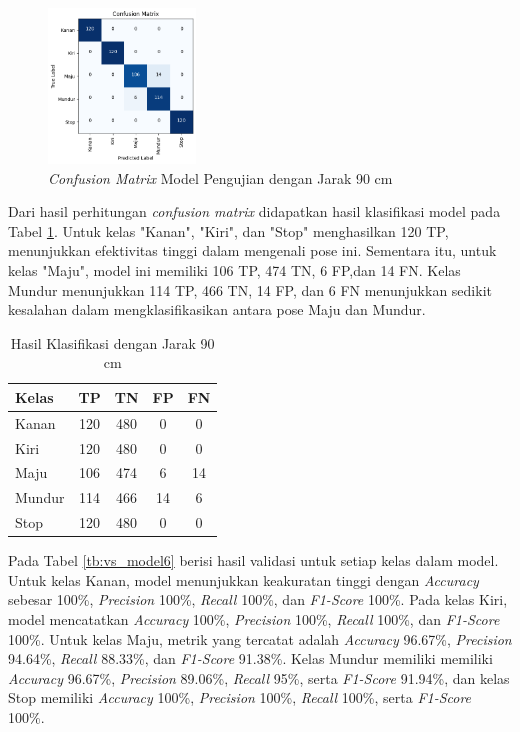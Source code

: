 \begin{figure} [H] \centering
  \includegraphics[width=0.35\textwidth]{gambar/bab4/model8 (90cm)/confusion.png}
  \caption{\emph{Confusion Matrix} Model Pengujian dengan Jarak 90 cm}
  \label{fig:matrix6}
\end{figure}

Dari hasil perhitungan \emph{confusion matrix} didapatkan hasil klasifikasi model pada Tabel \ref{tb:cm_model6}. Untuk kelas "Kanan", "Kiri", dan "Stop" menghasilkan 120 TP, menunjukkan efektivitas tinggi dalam mengenali pose ini. Sementara itu, untuk kelas "Maju", model ini memiliki 106 TP, 474 TN, 6 FP,dan 14 FN. Kelas Mundur menunjukkan 114 TP, 466 TN, 14 FP, dan 6 FN menunjukkan sedikit kesalahan dalam mengklasifikasikan antara pose Maju dan Mundur.  

\begin{longtable}{|l|c|c|c|c|}
  \caption{Hasil Klasifikasi dengan Jarak 90 cm}
  \label{tb:cm_model6} \\
  \hline
  \rowcolor[HTML]{C0C0C0} 
  \textbf{Kelas} & \textbf{TP} & \textbf{TN} & \textbf{FP} & \textbf{FN} \\ \hline
  Kanan    & 120          & 480         & 0           & 0           \\ \hline
  Kiri      & 120          & 480         & 0           & 0           \\ \hline
  Maju      & 106          & 474         & 6           & 14           \\ \hline
  Mundur     & 114          & 466         & 14           & 6           \\ \hline
  Stop  & 120          & 480         & 0           & 0           \\ \hline
\end{longtable}

Pada Tabel \ref{tb:vs_model6} berisi hasil validasi untuk setiap kelas dalam model. Untuk kelas Kanan, model menunjukkan keakuratan tinggi dengan \textit{Accuracy} sebesar 100\%, \textit{Precision} 100\%, \textit{Recall} 100\%, dan \textit{F1-Score} 100\%. Pada kelas Kiri, model mencatatkan \textit{Accuracy} 100\%, \textit{Precision} 100\%, \textit{Recall} 100\%, dan \textit{F1-Score} 100\%. Untuk kelas Maju, metrik yang tercatat adalah \textit{Accuracy} 96.67\%, \textit{Precision} 94.64\%, \textit{Recall} 88.33\%, dan \textit{F1-Score} 91.38\%. Kelas Mundur memiliki memiliki \textit{Accuracy} 96.67\%, \textit{Precision} 89.06\%, \textit{Recall} 95\%, serta \textit{F1-Score} 91.94\%, dan kelas Stop memiliki \textit{Accuracy} 100\%, \textit{Precision} 100\%, \textit{Recall} 100\%, serta \textit{F1-Score} 100\%. 


